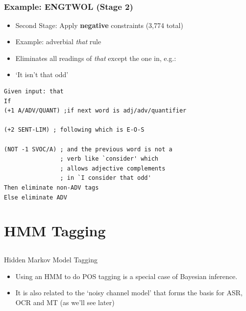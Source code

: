 \documentclass[9pt,xcolor=pdftex,dvipsnames,table]{beamer}
\begin{document}
\subsection{}
\begin{frame}[fragile]
\frametitle{Example: ENGTWOL (Stage 2)}

	\begin{itemize}
		\item Second Stage: Apply \textbf{negative} constraints (3,774 total)
		\item Example: adverbial \emph{that} rule
		\item Eliminates all readings of \emph{that} except the one in, e.g.:
		\item `It isn't that odd'
	\end{itemize}
	
	\vspace{.25cm}
\begin{lstlisting}
Given input: that
If
(+1 A/ADV/QUANT) ;if next word is adj/adv/quantifier

(+2 SENT-LIM) ; following which is E-O-S

(NOT -1 SVOC/A)	; and the previous word is not a
                ; verb like `consider' which
                ; allows adjective complements
                ; in `I consider that odd'
Then eliminate non-ADV tags
Else eliminate ADV
\end{lstlisting}
\end{frame}

\section{HMM Tagging}

\subsection{}
\begin{frame}{Hidden Markov Model Tagging}

	\begin{itemize}
		\item Using an HMM to do POS tagging is a special case of Bayesian inference.
		\item It is also related to the `noisy channel model' that forms the basis for ASR, OCR and MT (as we'll see later)
	\end{itemize}
\end{frame}
\end{document}
